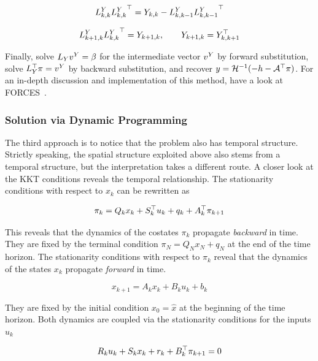 \[
{L^{Y}_{k,k}} {L^{Y}_{k,k}}^\top = Y_{k,k} - {L^{Y}_{k,k-1}} {L^{Y}_{k,k-1}}^\top
\]

\[
{L^{Y}_{k+1,k}} {L^{Y}_{k,k}}^\top = Y_{k+1,k}, \qquad Y_{k+1,k} = Y_{k,k+1}^\top
\]

Finally, solve $L_Y v^{Y} = \beta$ for the intermediate vector $v^{Y}$ by forward substitution, solve $L_Y^\top \pi = v^{Y}$ by backward substitution, and recover $y = \mathcal{H}^{-1}(-h - \mathcal{A}^\top \pi)$.
For an in-depth discussion and implementation of this method, have a look at FORCES~\cite{domahidi2012efficient}.

\subsubsection{Solution via Dynamic Programming}
\label{sec:dp}

The third approach is to notice that the problem also has temporal structure.
Strictly speaking, the spatial structure exploited above also stems from a temporal structure, but the interpretation takes a different route.
A closer look at the KKT conditions reveals the temporal relationship.
The stationarity conditions with respect to $x_k$ can be rewritten as

\[
\pi_k = Q_k x_k + S_k^\top u_k + q_k + A_k^\top \pi_{k+1}
\]

This reveals that the dynamics of the costates $\pi_k$ propagate \textit{backward} in time.
They are fixed by the terminal condition $\pi_N = Q_N x_N + q_N$ at the end of the time horizon.
The stationarity conditions with respect to $\pi_k$ reveal that the dynamics of the states $x_k$ propagate \textit{forward} in time.

\[
x_{k+1} = A_k x_k + B_k u_k + b_k
\]

They are fixed by the initial condition $x_0 = \hat{x}$ at the beginning of the time horizon.
Both dynamics are coupled via the stationarity conditions for the inputs $u_k$

\[
R_k u_k + S_k x_k + r_k + B_k^\top \pi_{k+1} = 0
\]

